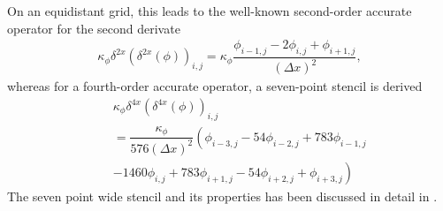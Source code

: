 \documentclass[gmd]{copernicus}
\begin{document}
On an equidistant grid, this leads to the well-known second-order accurate operator for the second derivate
\begin{eqnarray}
\kappa_\phi \delta^{2x} \left( \delta^{2x} \left( \phi \right) \right)_{i,j} =
\kappa_\phi \dfrac{ \phi_{i-1,j} - 2 \phi_{i,j} + \phi_{i+1,j} }{\left( \Delta x \right)^2},
\end{eqnarray}
whereas for a fourth-order accurate operator, a seven-point stencil is derived
\begin{eqnarray}
\nonumber
&& \kappa_\phi \delta^{4x} \left( \delta^{4x} \left( \phi \right) \right)_{i,j}\\
\nonumber
&& = \dfrac{\kappa_\phi}{576 \left( \Delta x \right)^2} \left( \phi_{i-3,j} - 54 \phi_{i-2,j} + 783 \phi_{i-1,j}\right.\\
&&  \left. - 1460  \phi_{i,j} + 783 \phi_{i+1,j} - 54 \phi_{i+2,j} + \phi_{i+3,j} \right)
\end{eqnarray}
The seven point wide stencil and its properties has been discussed in detail in \citet{Castillo1995}.
\end{document}
